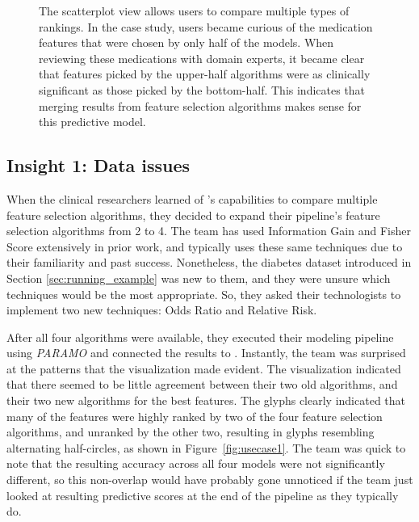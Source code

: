 \begin{figure}[ht]
{\begin{tikzpicture}
\end{tikzpicture}%
}
\caption{
The scatterplot view allows users to compare multiple types of rankings.  In the case study, users became curious of the medication features that were chosen by only half of the models.  When reviewing these medications with domain experts, it became clear that features picked by the upper-half algorithms were as clinically significant as those picked by the bottom-half.  This indicates that merging results from feature selection algorithms makes sense for this predictive model.
}
\label{fig:usecase2}
\end{figure}

\subsection{Insight 1: Data issues}
When the clinical researchers learned of \infuse's capabilities
to compare multiple feature selection algorithms, they decided to
expand their pipeline's feature selection algorithms from 2 to 4.
The team has used Information Gain and Fisher Score extensively
in prior work, and typically uses these same techniques due
to their familiarity and past success.
Nonetheless, the diabetes dataset introduced in Section \ref{sec:running_example} was new to them, and they were unsure which techniques would be the most appropriate. So, they asked their technologists to implement two new techniques: Odds Ratio and Relative Risk.

After all four algorithms were available, they executed their modeling pipeline
using \textit{PARAMO} \cite{paramo} and connected the results to \infuse.
Instantly, the team was surprised at the patterns that the visualization made evident.
The visualization indicated that there seemed to be little agreement between their two
old algorithms, and their two new algorithms for the best features.
The glyphs clearly indicated that many of the features were
highly ranked by two of the four feature selection algorithms,
and unranked by the other two, resulting in glyphs resembling alternating half-circles,
as shown in Figure~\ref{fig:usecase1}.
The team was quick to note that the resulting accuracy across
all four models were not significantly different,
so this non-overlap would have probably gone unnoticed if the
team just looked at resulting predictive scores at the
end of the pipeline as they typically do.

